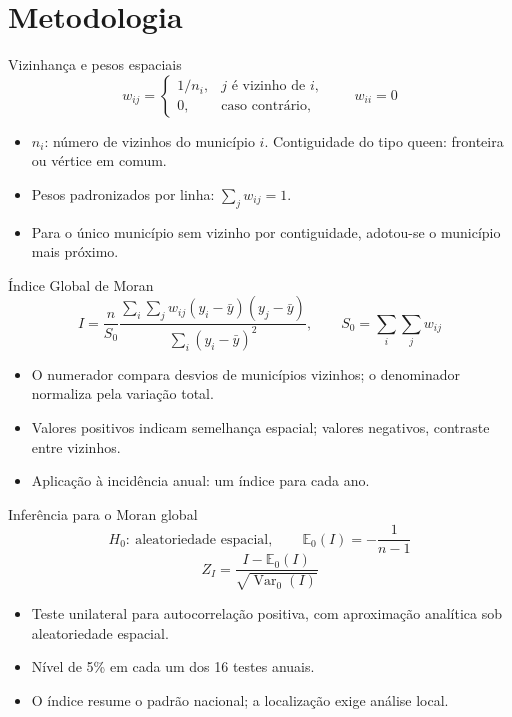 \documentclass[aspectratio=169,11pt]{beamer}
\newcommand{\fonte}[1]{\par\vspace{0.15cm}{\fontsize{7}{9}\selectfont\color{cinza}#1\par}}
\begin{document}
\section{Metodologia}
\begin{frame}{Vizinhança e pesos espaciais}
\[
w_{ij}=\begin{cases}1/n_i,&j\text{ é vizinho de }i,\\0,&\text{caso contrário},\end{cases}
\qquad w_{ii}=0
\]
\begin{itemize}
\item $n_i$: número de vizinhos do município $i$. Contiguidade do tipo queen: fronteira ou vértice em comum.
\item Pesos padronizados por linha: $\sum_jw_{ij}=1$.
\item Para o único município sem vizinho por contiguidade, adotou-se o município mais próximo.
\end{itemize}
\end{frame}

\begin{frame}{Índice Global de Moran}
\[
I=\frac{n}{S_0}\frac{\sum_i\sum_jw_{ij}(y_i-\bar y)(y_j-\bar y)}{\sum_i(y_i-\bar y)^2},
\qquad S_0=\sum_i\sum_jw_{ij}
\]
\begin{itemize}
\item O numerador compara desvios de municípios vizinhos; o denominador normaliza pela variação total.
\item Valores positivos indicam semelhança espacial; valores negativos, contraste entre vizinhos.
\item Aplicação à incidência anual: um índice para cada ano.
\end{itemize}\fonte{\cite{moran1950}.}
\end{frame}

\begin{frame}{Inferência para o Moran global}
\[
H_0:\ \text{aleatoriedade espacial},\qquad
\mathbb E_0(I)=-\frac{1}{n-1}
\]
\[
Z_I=\frac{I-\mathbb E_0(I)}{\sqrt{\operatorname{Var}_0(I)}}
\]
\begin{itemize}
\item Teste unilateral para autocorrelação positiva, com aproximação analítica sob aleatoriedade espacial.
\item Nível de 5\% em cada um dos 16 testes anuais.
\item O índice resume o padrão nacional; a localização exige análise local.
\end{itemize}
\end{frame}
\end{document}
